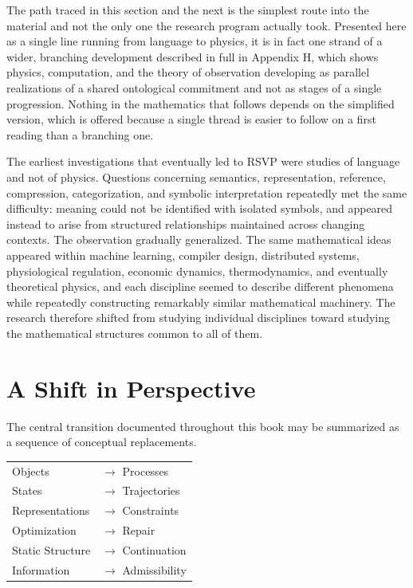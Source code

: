 \documentclass[11pt,oneside]{book}
\numberwithin{equation}{chapter}
\theoremstyle{definition}
\theoremstyle{plain}
\begin{document}
The path traced in this section and the next is the simplest route into the material and not the only one the research program actually took. Presented here as a single line running from language to physics, it is in fact one strand of a wider, branching development described in full in Appendix H, which shows physics, computation, and the theory of observation developing as parallel realizations of a shared ontological commitment and not as stages of a single progression. Nothing in the mathematics that follows depends on the simplified version, which is offered because a single thread is easier to follow on a first reading than a branching one.

The earliest investigations that eventually led to RSVP were studies of language and not of physics. Questions concerning semantics, representation, reference, compression, categorization, and symbolic interpretation repeatedly met the same difficulty: meaning could not be identified with isolated symbols, and appeared instead to arise from structured relationships maintained across changing contexts. The observation gradually generalized. The same mathematical ideas appeared within machine learning, compiler design, distributed systems, physiological regulation, economic dynamics, thermodynamics, and eventually theoretical physics, and each discipline seemed to describe different phenomena while repeatedly constructing remarkably similar mathematical machinery. The research therefore shifted from studying individual disciplines toward studying the mathematical structures common to all of them.

\section{A Shift in Perspective}

The central transition documented throughout this book may be summarized as
a sequence of conceptual replacements.

\begin{center}
\begin{tabular}{ll}
Objects & $\longrightarrow$ Processes \\
States & $\longrightarrow$ Trajectories \\
Representations & $\longrightarrow$ Constraints \\
Optimization & $\longrightarrow$ Repair \\
Static Structure & $\longrightarrow$ Continuation \\
Information & $\longrightarrow$ Admissibility
\end{tabular}
\end{center}
\end{document}
